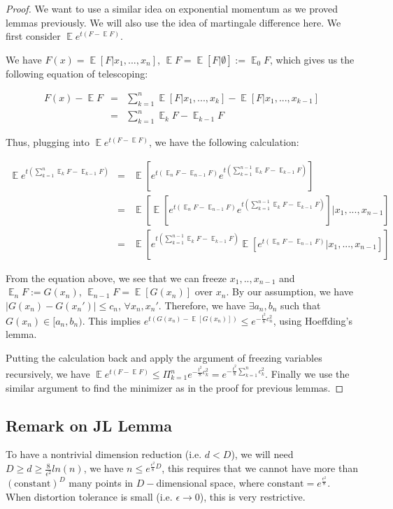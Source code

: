 \documentclass[11pt,letter]{article}
\DeclareMathOperator{\E}{\mathbb{E}}
\begin{document}
\begin{proof}
We want to use a similar idea on exponential momentum as we proved lemmas previously. We will also use the idea of martingale difference here. We first consider $\E e^{t(F-\E F)}$.

We have $F(x)=\E [F|x_1,...,x_n]$, $\E F=\E[F|\emptyset]:=\E_0 F$, which gives us the following equation of telescoping:

\begin{eqnarray}
F(x)-\E F &=& \sum_{k=1}^n \E[F|x_1,...,x_k]-\E[F|x_1,...,x_{k-1}] \nonumber \\
&=& \sum_{k=1}^n \E_k F-\E_{k-1} F \nonumber
\end{eqnarray}

Thus, plugging into $\E e^{t(F-\E F)}$, we have the following calculation:

\begin{eqnarray}
\E e^{t(\sum_{k=1}^n \E_k F-\E_{k-1} F)} &=& \E[ e^{t(\E_n F-\E_{n-1} F)} e^{t(\sum_{k=1}^{n-1} \E_k F-\E_{k-1} F)}] \nonumber \\
&=& \E[\E[e^{t(\E_n F-\E_{n-1} F)} e^{t(\sum_{k=1}^{n-1} \E_k F-\E_{k-1} F)}]|x_1,...,x_{n-1}] \nonumber \\
&=& \E[e^{t(\sum_{k=1}^{n-1} \E_k F-\E_{k-1} F)} \E[e^{t(\E_n F-\E_{n-1} F)}|x_1,...,x_{n-1}]] \nonumber
\end{eqnarray}

From the equation above, we see that we can freeze $x_1,..,x_{n-1}$ and $\E_n F:=G(x_n)$, $\E_{n-1} F=\E[G(x_n)]$ over $x_n$. By our assumption, we have $|G(x_n)-G(x_n')|\leq c_n$, $\forall x_n, x_n'$. Therefore, we have $\exists a_n, b_n$ such that $G(x_n)\in [a_n,b_n)$. This implies $e^{t(G(x_n)-\E[G(x_n)])}\leq e^{-\frac{t^2}{8}c_n^2}$, using Hoeffding's lemma.

Putting the calculation back and apply the argument of freezing variables recursively, we have $\E e^{t(F-\E F)} \leq \Pi_{k=1}^n e^{-\frac{t^2}{8}c_k^2}=e^{-\frac{t^2}{8}\sum_{k=1}^nc_k^2}$. Finally we use the similar argument to find the minimizer as in the proof for previous lemmas.
\end{proof}

\subsection{Remark on JL Lemma}

To have a nontrivial dimension reduction (i.e. $d<D$), we will need $D\geq d \geq \frac{8}{\epsilon^2}ln(n)$, we have $n\leq e^{\frac{\epsilon^2}{8}D}$, this requires that we cannot have more than $(\text{constant})^D$ many points in $D-$dimensional space, where $\text{constant}=e^{\frac{\epsilon^2}{8}}$. When distortion tolerance is small (i.e. $\epsilon \to 0$), this is very restrictive.
\end{document}
